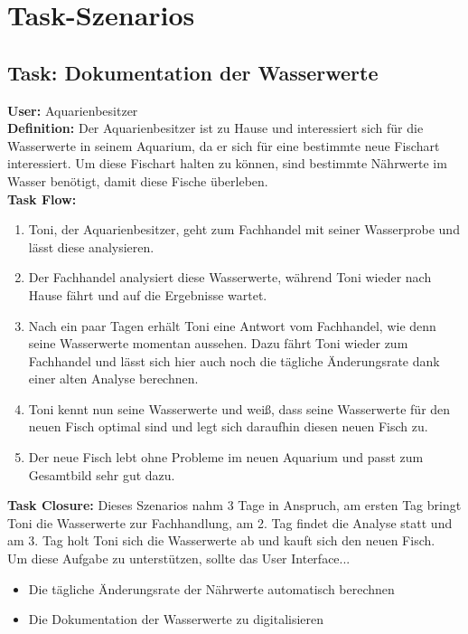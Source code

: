 \section{Task-Szenarios}
\subsection{Task: Dokumentation der Wasserwerte}
\textbf{User:} Aquarienbesitzer\\

\textbf{Definition:} Der Aquarienbesitzer ist zu Hause und interessiert sich für die Wasserwerte in seinem Aquarium, da er sich für eine bestimmte neue Fischart interessiert. Um diese Fischart halten zu können, sind bestimmte Nährwerte im Wasser benötigt, damit diese Fische überleben.\\

\textbf{Task Flow:}
\begin{enumerate}
 	\item Toni, der Aquarienbesitzer, geht zum Fachhandel mit seiner Wasserprobe und lässt diese analysieren.
 	\item Der Fachhandel analysiert diese Wasserwerte, während Toni wieder nach Hause fährt und auf die Ergebnisse wartet.
 	\item Nach ein paar Tagen erhält Toni eine Antwort vom Fachhandel, wie denn seine Wasserwerte momentan aussehen. Dazu fährt Toni wieder zum Fachhandel und lässt sich  hier auch noch die tägliche Änderungsrate dank einer alten Analyse berechnen.
 	\item Toni kennt nun seine Wasserwerte und weiß, dass seine Wasserwerte für den neuen Fisch optimal sind und legt sich daraufhin diesen neuen Fisch zu.
	 \item Der neue Fisch lebt ohne Probleme im neuen Aquarium und passt zum Gesamtbild sehr gut dazu.
\end{enumerate}
\textbf{Task Closure:} Dieses Szenarios nahm 3 Tage in Anspruch, am ersten Tag bringt Toni die Wasserwerte zur Fachhandlung, am 2. Tag findet die Analyse statt und am 3. Tag holt Toni sich die Wasserwerte ab und kauft sich den neuen Fisch.\\

Um diese Aufgabe zu unterstützen, sollte das User Interface...
\begin{itemize}
  \item Die tägliche Änderungsrate der Nährwerte automatisch berechnen
  \item Die Dokumentation der Wasserwerte zu digitalisieren
\end{itemize}	


